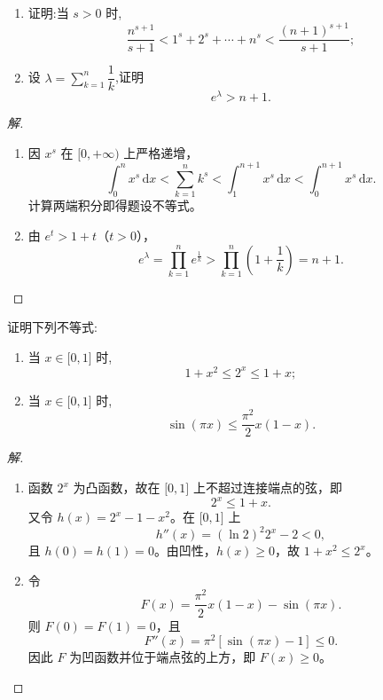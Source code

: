 \documentclass[../../数学分析培优讲义(答案版).tex]{subfiles}
\begin{document}
\begin{example}
\begin{enumerate}[label=(\arabic*)]
    \item 证明:当 $s>0$ 时,
    \[
        \dfrac{n^{s+1}}{s+1}
        <1^s+2^s+\cdots+n^s
        <\dfrac{(n+1)^{s+1}}{s+1};
    \]
    \item 设 $\displaystyle\lambda=\sum\limits_{k=1}^n\dfrac{1}{k}$,证明
    \[
        e^\lambda>n+1.
    \]
\end{enumerate}
\end{example}

\begin{proof}[解]
\begin{enumerate}[label=(\arabic*)]
    \item 因 $x^s$ 在 $\lbrack0,+\infty)$ 上严格递增，
    \[
        \int_0^n x^s\,\mathrm{d}x
        <\sum\limits_{k=1}^{n}k^s
        <\int_1^{n+1}x^s\,\mathrm{d}x
        <\int_0^{n+1}x^s\,\mathrm{d}x.
    \]
    计算两端积分即得题设不等式。

    \item 由 $e^t>1+t$（$t>0$），
    \[
        e^\lambda
        =\prod\limits_{k=1}^{n}e^{\frac{1}{k}}
        >\prod\limits_{k=1}^{n}\left(1+\dfrac{1}{k}\right)
        =n+1.
    \]
\end{enumerate}
\end{proof}


\begin{example}
证明下列不等式:
\begin{enumerate}[label=(\arabic*)]
    \item 当 $x\in\lbrack 0,1\rbrack$ 时,
    \[
        1+x^2\leq2^x\leq1+x;
    \]
    \item 当 $x\in\lbrack 0,1\rbrack$ 时,
    \[
        \sin(\pi x)\leq\dfrac{\pi^2}{2}x(1-x).
    \]
\end{enumerate}
\end{example}

\begin{proof}[解]
\begin{enumerate}[label=(\arabic*)]
    \item 函数 $2^x$ 为凸函数，故在 $\lbrack0,1\rbrack$ 上不超过连接端点的弦，即
    \[
        2^x\leq1+x.
    \]
    又令 $h(x)=2^x-1-x^2$。在 $\lbrack0,1\rbrack$ 上
    \[
        h''(x)=(\ln2)^2 2^x-2<0,
    \]
    且 $h(0)=h(1)=0$。由凹性，$h(x)\geq0$，故 $1+x^2\leq2^x$。

    \item 令
    \[
        F(x)=\dfrac{\pi^2}{2}x(1-x)-\sin(\pi x).
    \]
    则 $F(0)=F(1)=0$，且
    \[
        F''(x)=\pi^2[\sin(\pi x)-1]\leq0.
    \]
    因此 $F$ 为凹函数并位于端点弦的上方，即 $F(x)\geq0$。
\end{enumerate}
\end{proof}
\end{document}
